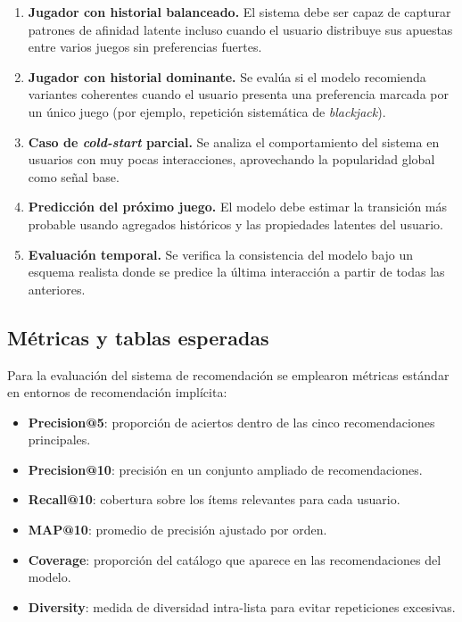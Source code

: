 \documentclass[12pt,a4paper]{article}
\begin{document}
\begin{enumerate}
    \item \textbf{Jugador con historial balanceado.}
    El sistema debe ser capaz de capturar patrones de afinidad latente incluso cuando el
    usuario distribuye sus apuestas entre varios juegos sin preferencias fuertes.

    \item \textbf{Jugador con historial dominante.}
    Se evalúa si el modelo recomienda variantes coherentes cuando el usuario presenta
    una preferencia marcada por un único juego (por ejemplo, repetición sistemática de
    \textit{blackjack}).

    \item \textbf{Caso de \textit{cold-start} parcial.}
    Se analiza el comportamiento del sistema en usuarios con muy pocas interacciones,
    aprovechando la popularidad global como señal base.

    \item \textbf{Predicción del próximo juego.}
    El modelo debe estimar la transición más probable usando agregados históricos
    y las propiedades latentes del usuario.

    \item \textbf{Evaluación temporal.}
    Se verifica la consistencia del modelo bajo un esquema realista donde se predice la
    última interacción a partir de todas las anteriores.
\end{enumerate}


\subsection{Métricas y tablas esperadas}

Para la evaluación del sistema de recomendación se emplearon métricas estándar en
entornos de recomendación implícita:

\begin{itemize}
    \item \textbf{Precision@5}: proporción de aciertos dentro de las cinco recomendaciones principales.
    \item \textbf{Precision@10}: precisión en un conjunto ampliado de recomendaciones.
    \item \textbf{Recall@10}: cobertura sobre los ítems relevantes para cada usuario.
    \item \textbf{MAP@10}: promedio de precisión ajustado por orden.
    \item \textbf{Coverage}: proporción del catálogo que aparece en las recomendaciones del modelo.
    \item \textbf{Diversity}: medida de diversidad intra-lista para evitar repeticiones excesivas.
\end{itemize}
\end{document}
